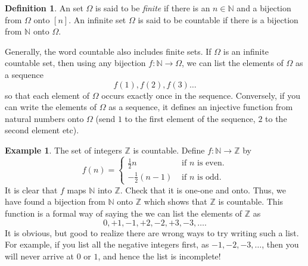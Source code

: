 \documentclass[preprint,  11pt]{amsart}
\theoremstyle{plain} %
\theoremstyle{definition} %
\newtheorem{definition}[theorem]{Definition}
\newtheorem{example}[theorem]{Example}
\begin{document}


\begin{definition} An set $\Omega$ is said to be {\em finite} if there is an $n\in \mathbb{N}$ and a bijection from $\Omega$ onto $[n]$. An infinite set $\Omega$ is said to be countable if there is a bijection from $\mathbb{N}$ onto $\Omega$. 
\end{definition}
Generally, the word countable also includes finite sets. If $\Omega$ is an infinite countable set, then using any bijection $f:\mathbb{N}\rightarrow \Omega$, we can list the elements of $\Omega$ as a sequence $$f(1),f(2),f(3)\ldots$$ so that each element of $\Omega$ occurs exactly once in the sequence. Conversely, if you can write the elements of $\Omega$ as a sequence, it defines an injective function from natural numbers onto $\Omega$ (send $1$ to the first element of the sequence, $2$ to the second element etc).

\begin{example} The set of integers $\mathbb{Z}$ is countable. Define $f:\mathbb{N}\rightarrow \mathbb{Z}$ by 
$$
f(n)=\begin{cases}\frac{1}{2} n & \mbox{ if }n\mbox{ is even}. \\
-\frac{1}{2} (n-1) & \mbox{ if }n\mbox{ is odd}.
\end{cases}
$$ 
It is clear that $f$ maps $\mathbb{N}$ into $\mathbb{Z}$. Check that it is one-one and onto. Thus, we have found a bijection from $\mathbb{N}$ onto $\mathbb{Z}$ which shows that $\mathbb{Z}$ is countable. This function is a formal way of saying the we can list the elements of $\mathbb{Z}$ as
$$
0, +1, -1,+2,-2,+3,-3,\ldots.
$$
It is obvious, but good to realize there are wrong ways to try writing such a list. For example, if you list all the negative integers first, as $-1,-2,-3,\ldots$, then you will never arrive at $0$ or $1$, and hence the list is incomplete!
\end{example}
\end{document}
